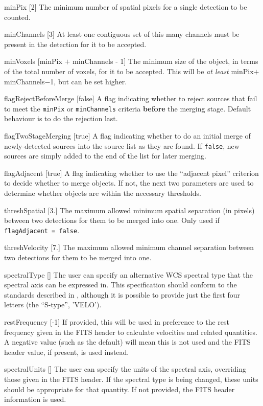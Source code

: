 \begin{Lentry}
\item[{minPix [2]}] The minimum number of spatial pixels for a
  single detection to be counted.
\item[{minChannels [3]}] At least one contiguous set of this many
  channels must be present in the detection for it to be accepted.
\item[{minVoxels [minPix $+$ minChannels - 1]}] The minimum size of
  the object, in terms of the total number of voxels, for it to be
  accepted. This will be \textit{at least} minPix$+$minChannels$-$1,
  but can be set higher.
\item[{flagRejectBeforeMerge [false]}] A flag indicating whether to
  reject sources that fail to meet the \texttt{minPix} or
  \texttt{minChannels} criteria \textbf{before} the merging
  stage. Default behaviour is to do the rejection last.
\item[{flagTwoStageMerging [true]}] A flag indicating whether to do an
  initial merge of newly-detected sources into the source list as they
  are found. If \texttt{false}, new sources are simply added to the
  end of the list for later merging.
\item[{flagAdjacent [true]}] A flag indicating whether to use
  the ``adjacent pixel'' criterion to decide whether to merge
  objects. If not, the next two parameters are used to determine
  whether objects are within the necessary thresholds.
\item[{threshSpatial [3.]}] The maximum allowed minimum spatial
  separation (in pixels) between two detections for them to be merged
  into one. Only used if \texttt{flagAdjacent = false}.
\item[{threshVelocity [7.]}] The maximum allowed minimum channel
  separation between two detections for them to be merged into
  one. 
\end{Lentry}

\begin{Lentry}
\item[{spectralType []}] The user can specify an alternative WCS
  spectral type that the spectral axis can be expressed in. This
  specification should conform to the standards described in
  \citet{greisen06}, although it is possible to provide just the first
  four letters (the ``S-type'', \eg 'VELO').
\item[{restFrequency [-1]}] If provided, this will be used in
  preference to the rest frequency given in the FITS header to
  calculate velocities and related quantities. A negative value (such
  as the default) will mean this is not used and the FITS header
  value, if present, is used instead.
\item[{spectralUnits []}] The user can specify the units of
  the spectral axis, overriding those given in the FITS header. If the
  spectral type is being changed, these units should be appropriate
  for that quantity. If not provided, the FITS header information is
  used. 
\end{Lentry}

